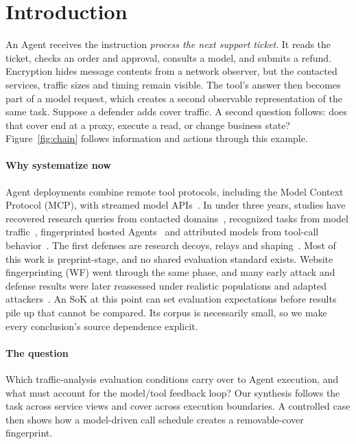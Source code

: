 \section{Introduction}
An Agent receives the instruction \emph{process the next support ticket}. It reads the ticket, checks an order and approval, consults a model, and submits a refund. Encryption hides message contents from a network observer, but the contacted services, traffic sizes and timing remain visible. The tool's answer then becomes part of a model request, which creates a second observable representation of the same task. Suppose a defender adds cover traffic. A second question follows: does that cover end at a proxy, execute a read, or change business state? Figure~\ref{fig:chain} follows information and actions through this example.



\paragraph{Why systematize now}
Agent deployments combine remote tool protocols, including the Model Context Protocol (MCP), with streamed model APIs~\cite{mcp2025transports,rfc9113}. In under three years, studies have recovered research queries from contacted domains~\cite{jeong2026wra}, recognized tasks from model traffic~\cite{li2026ant,pouryousef2026traffic}, fingerprinted hosted Agents~\cite{agentprint2025} and attributed models from tool-call behavior~\cite{zhao2026agenttrace,ediga2026trace}. The first defenses are research decoys, relays and shaping~\cite{jeong2026wra,dangol2026workflow}. Most of this work is preprint-stage, and no shared evaluation standard exists. Website fingerprinting (WF) went through the same phase, and many early attack and defense results were later reassessed under realistic populations and adapted attackers~\cite{dyer2012peekaboo,juarez2014critical,mathews2023critical}. An SoK at this point can set evaluation expectations before results pile up that cannot be compared. Its corpus is necessarily small, so we make every conclusion's source dependence explicit.

\paragraph{The question}
Which traffic-analysis evaluation conditions carry over to Agent execution, and what must account for the model/tool feedback loop? Our synthesis follows the task across service views and cover across execution boundaries. A controlled case then shows how a model-driven call schedule creates a removable-cover fingerprint.

